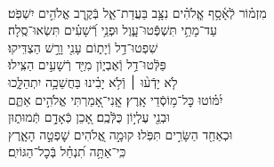 \documentclass[twoside, openany, parskip=half, 11pt]{book}
\begin{document}
{\enlargethispage{\baselineskip}

\\
\vspace{-1.5\baselineskip}
\begin{narrow}
%
מִזְמ֗וֹר לְֿאָ֫סָ֥ף \hfill \break
אֱֽלֹהִ֗ים נִצָּ֥ב בַּעֲדַת־אֵ֑ל \hfill בְּֿקֶ֖רֶב אֱלֹהִ֣ים יִשְׁפֹּֽט׃ \\
עַד־מָתַ֥י תִּשְׁפְּֿֿטוּ־עָ֑וֶל \hfill וּפְנֵ֥י רְֿ֝שָׁעִ֗ים תִּשְׂאוּ־סֶֽלָה׃ \\
שִׁפְטוּ־דַ֥ל וְֿיָת֑וֹם \hfill עָנִ֖י וָרָ֣שׁ הַצְדִּֽיקוּ׃ \\
פַּלְּֿטוּ־דַ֥ל וְֿאֶבְי֑וֹן \hfill מִיַּ֖ד רְֿשָׁעִ֣ים הַצִּֽילוּ׃ \\
לֹ֤א יָדְֿע֨וּ ׀ וְֿלֹ֥א יָבִ֗ינוּ \hfill בַּחֲשֵׁכָ֥ה יִתְהַלָּ֑כוּ \\ יִ֝מּ֗וֹטוּ כׇּל־מ֥וֹסְֿדֵי אָֽרֶץ׃ \hfill
אֲֽנִי־אָ֭מַרְתִּי אֱלֹהִ֣ים אַתֶּ֑ם \\ וּבְנֵ֖י עֶלְי֣וֹן כֻּלְּֿכֶֽם׃ \hfill
אָ֭כֵן כְּֿאָדָ֣ם תְּֿמוּת֑וּן \\ וּכְאַחַ֖ד הַשָּׂרִ֣ים תִּפֹּֽלוּ׃ \hfill
קוּמָ֣ה אֱ֭לֹהִים שׇׁפְטָ֣ה הָאָ֑רֶץ \\ כִּֽי־אַתָּ֥ה תִ֝נְחַ֗ל בְּֿכׇל־הַגּוֹיִֽם׃ \hfill \break
\end{narrow}


}
\end{document}
